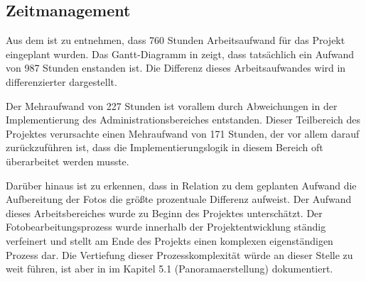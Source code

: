 \subsection{Zeitmanagement}
\label{sec:Zeitmanagement}

Aus dem  ist zu entnehmen, dass 760 Stunden Arbeitsaufwand für das Projekt
eingeplant wurden. Das Gantt-Diagramm in  zeigt, dass tatsächlich
ein Aufwand von 987 Stunden enstanden ist.
Die Differenz dieses Arbeitsaufwandes wird in  differenzierter dargestellt.



Der Mehraufwand von 227 Stunden ist vorallem durch Abweichungen in der Implementierung des Administrationsbereiches
entstanden. Dieser Teilbereich des Projektes verursachte einen Mehraufwand von
171 Stunden, der vor allem darauf zurückzuführen ist, dass die Implementierungslogik in diesem Bereich oft überarbeitet werden musste.

Darüber hinaus ist zu erkennen, dass in Relation zu dem geplanten Aufwand die Aufbereitung der Fotos die größte
prozentuale Differenz aufweist. Der Aufwand dieses Arbeitsbereiches wurde zu Beginn des Projektes unterschätzt.
Der Fotobearbeitungsprozess wurde innerhalb der Projektentwicklung ständig verfeinert und stellt am Ende des Projekts
einen komplexen eigenständigen Prozess dar. Die Vertiefung dieser Prozesskomplexität würde an dieser Stelle zu weit
führen, ist aber in \citet{modelierungUndBetrieb2014} im Kapitel 5.1 (Panoramaerstellung) dokumentiert.